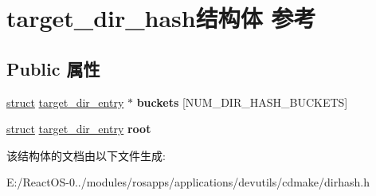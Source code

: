 \hypertarget{structtarget__dir__hash}{}\section{target\+\_\+dir\+\_\+hash结构体 参考}
\label{structtarget__dir__hash}
\subsection*{Public 属性}
\begin{DoxyCompactItemize}
\item 
\mbox{\label{structtarget__dir__hash_aacf1cbf00a98db469ec7595eae663562}} 
\hyperlink{interfacestruct}{struct} \hyperlink{structtarget__dir__entry}{target\+\_\+dir\+\_\+entry} $\ast$ {\bfseries buckets} \mbox{[}N\+U\+M\+\_\+\+D\+I\+R\+\_\+\+H\+A\+S\+H\+\_\+\+B\+U\+C\+K\+E\+TS\mbox{]}
\item 
\mbox{\label{structtarget__dir__hash_a828617111e30dd7d64ea52a3e71cf07e}} 
\hyperlink{interfacestruct}{struct} \hyperlink{structtarget__dir__entry}{target\+\_\+dir\+\_\+entry} {\bfseries root}
\end{DoxyCompactItemize}


该结构体的文档由以下文件生成\+:\begin{DoxyCompactItemize}
\item 
E\+:/\+React\+O\+S-\/0../modules/rosapps/applications/devutils/cdmake/dirhash.\+h\end{DoxyCompactItemize}
